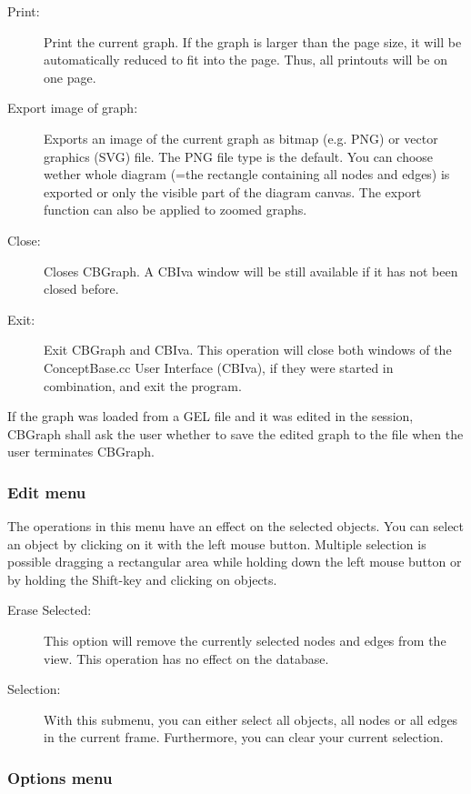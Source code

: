 \begin{description}
\item[Print:] Print the current graph. If the graph is larger than
the page size, it will be automatically reduced to fit into the page.
Thus, all printouts will be on one page.

\item[Export image of graph:] Exports an image of the current graph
as bitmap (e.g. PNG) or vector graphics (SVG) file. The PNG file type is the default.
You can choose wether whole diagram (=the rectangle containing all nodes and edges)
is exported or only the visible part of the diagram canvas. The export function can also
be applied to zoomed graphs.

\item[Close:] Closes CBGraph. A CBIva window will be still available
if it has not been closed before.

\item[Exit:] Exit CBGraph and CBIva. This operation will close
both windows of the ConceptBase.cc User Interface (CBIva), if they were started
in combination, and exit the program.
\end{description}

If the graph was loaded from a GEL file and it was edited in the session,
CBGraph shall ask the user whether to save the edited graph to the file
when the user terminates CBGraph.



\subsubsection{Edit menu}

The operations in this menu have an effect on the selected objects.
You can select an object by clicking on it with the left mouse button.
Multiple selection is possible dragging a rectangular area while holding
down the left mouse button or by holding the Shift-key and clicking
on objects.

\begin{description}
\item[Erase Selected:] This option will remove the currently selected
nodes and edges from the view. This operation has no effect on the database.
\item[Selection:] With this submenu, you can either select all objects,
all nodes or all edges in the current frame. Furthermore, you can clear your
current selection.
\end{description}

\subsubsection{Options menu}
\label{sec:optionsmenu}


